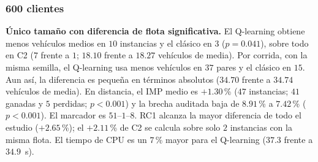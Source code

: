 \subsubsection{600 clientes}
\label{sec:exp-600}

\begin{table}[H]
\centering
\caption{Gehring y Homberger, $600$ clientes: resultados por clase.}
\label{tab:res-600}
\end{table}

\textbf{Único tamaño con diferencia de flota significativa.} El Q-learning obtiene menos
vehículos medios en $10$ instancias y el clásico en $3$ ($p=0.041$), sobre todo en C2 ($7$
frente a $1$; $18.10$ frente a $18.27$ vehículos de media). Por corrida, con la misma semilla,
el Q-learning usa menos vehículos en $37$ pares y el clásico en $15$. Aun así, la diferencia
es pequeña en términos absolutos ($34.70$ frente a $34.74$ vehículos de media). En distancia,
el IMP medio es $+1.30$\,\% ($47$ instancias; $41$ ganadas y $5$ perdidas; $p<0.001$) y la
brecha auditada baja de $8.91$\,\% a $7.42$\,\% ($p<0.001$). El marcador es $51$--$1$--$8$.
RC1 alcanza la mayor diferencia de todo el estudio ($+2.65$\,\%); el $+2.11$\,\% de C2 se
calcula sobre solo $2$ instancias con la misma flota. El tiempo de CPU es un $7$\,\% mayor
para el Q-learning ($37.3$ frente a $34.9$~s).

